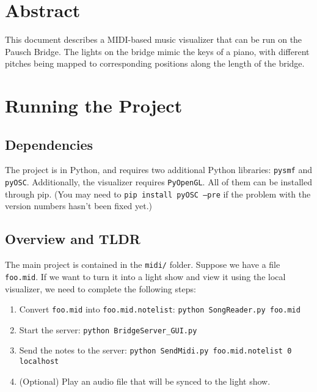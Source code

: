 \documentclass[11pt]{article}
\begin{document}
\thispagestyle{empty}

\setlength{\leftmargini}{0.3in}

\section{Abstract}

This document describes a MIDI-based music visualizer that can be run
on the Pausch Bridge. The lights on the bridge mimic the keys of a
piano, with different pitches being mapped to corresponding positions
along the length of the bridge.

\section{Running the Project}

\subsection{Dependencies}

The project is in Python, and requires two additional Python
libraries: \texttt{pysmf} and \texttt{pyOSC}. Additionally, the
visualizer requires \texttt{PyOpenGL}. All of them can be installed
through pip. (You may need to \texttt{pip install pyOSC --pre} if the
problem with the version numbers hasn't been fixed yet.)

\subsection{Overview and TLDR}

The main project is contained in the \texttt{midi/} folder. Suppose we
have a file \texttt{foo.mid}. If we want to turn it into a light show
and view it using the local visualizer, we need to complete the
following steps:

\begin{enumerate}

\item Convert \texttt{foo.mid} into \texttt{foo.mid.notelist}:
  \texttt{python SongReader.py foo.mid}

\item Start the server: \texttt{python BridgeServer\_GUI.py}

\item Send the notes to the server: \texttt{python SendMidi.py
  foo.mid.notelist 0 localhost}

\item (Optional) Play an audio file that will be synced to the light
  show.

\end{enumerate}
\end{document}
